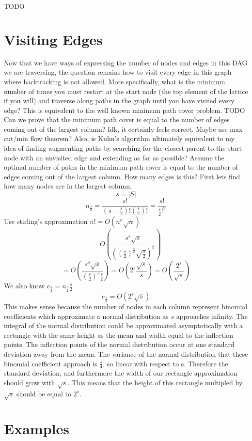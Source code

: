 \documentclass{article}
\begin{document}
TODO

\section{Visiting Edges}
Now that we have ways of expressing the number of nodes and edges in this DAG
we are traversing, the question remains how to visit every edge in this graph
where backtracking is not allowed. More specifically, what is the minimum
number of times you must restart at the start node (the top element of the
lattice if you will) and traverse along paths in the graph until you have
visited every edge? This is equivalent to the well known minimum path cover
problem.  TODO Can we prove that the minimum path cover is equal to the number
of edges coming out of the largest column? Idk, it certainly feels correct.
Maybe use max cut/min flow theorem? Also, is Kuhn's algorithm ultimately
equivalent to my idea of finding augmenting paths by searching for the closest
parent to the start node with an unvisited edge and extending as far as
possible?  Assume the optimal number of paths in the minimum path cover is
equal to the number of edges coming out of the largest column. How many edges
is this? First lets find how many nodes are in the largest column.
$$s = |S|$$
$$n_{\frac{s}{2}} = \frac{s!}{(s - \frac{s}{2})!(\frac{s}{2})!} = \frac{s!}{\frac{s}{2}!^2}$$
Use stirling's approximation $n! = O(n^n\sqrt{n})$
$$ = O(\frac{s^s\sqrt{s}}{((\frac{s}{2})^\frac{s}{2}\sqrt{\frac{s}{2}})^2})$$
$$ = O(\frac{s^s\sqrt{s}}{(\frac{s}{2})^s\frac{s}{2}}) = O(2^s\frac{\sqrt{s}}{s}) = O(\frac{2^s}{\sqrt{s}})$$
We also know $e_{\frac{s}{2}} = n_{\frac{s}{2}}\frac{s}{2}$
$$e_{\frac{s}{2}} = O(2^s\sqrt{s})$$
This makes sense because the number of nodes in each column represent binomial coefficients which approximate a normal distribution as $s$ approaches infinity. The integral of the normal distribution could be approximated asymptotically with a rectangle with the same height as the mean and width equal to the inflection points. The inflection points of the normal distribution occur at one standard deviation away from the mean. The variance of the normal distribution that these binomial coefficient approach is $\frac{s}{4}$, so linear with respect to s. Therefore the standard deviation, and furthermore the width of our rectangle approximation should grow with $\sqrt{s}$. This means that the height of this rectangle multipled by $\sqrt{s}$ should be equal to $2^s$.

\section{Examples}
\end{document}
